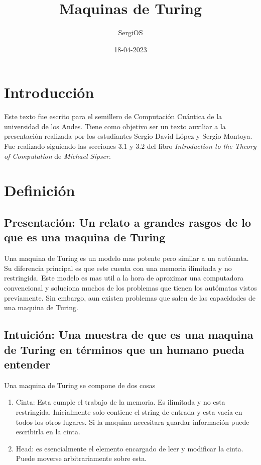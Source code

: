 \documentclass{report}
\title{\Huge{Maquinas de Turing}}
\author{\huge{SergiOS}}
\date{18-04-2023}
\begin{document}
\maketitle
\newpage%
\tableofcontents
\pagebreak

\chapter{Introducción}

Este texto fue escrito para el semillero de Computación Cuántica de la universidad de los Andes. Tiene como objetivo ser un texto auxiliar a la presentación realizada por los estudiantes Sergio David López y Sergio Montoya. Fue realizado siguiendo las secciones $3.1$ y $3.2$ del libro \textit{Introduction to the Theory of Computation} de \textit{Michael Sipser}.
\chapter{Definición}
\section{Presentación: Un relato a grandes rasgos de lo que es una maquina de Turing}
Una maquina de Turing es un modelo mas potente pero similar a un autómata. Su diferencia principal es que este cuenta con una memoria ilimitada y no restringida. Este modelo es mas util a la hora de aproximar una computadora convencional y soluciona muchos de los problemas que tienen los autómatas vistos previamente. Sin embargo, aun existen problemas que salen de las capacidades de una maquina de Turing.
\section{Intuición: Una muestra de que es una maquina de Turing en términos que un humano pueda entender}

Una maquina de Turing se compone de dos cosas
\begin{enumerate}
  \item Cinta: Esta cumple el trabajo de la memoria. Es ilimitada y no esta restringida. Inicialmente solo contiene el string de entrada y esta vacía en todos los otros lugares. Si la maquina necesitara guardar información puede escribirla en la cinta.
  \item Head: es esencialmente el elemento encargado de leer y modificar la cinta. Puede moverse arbitrariamente sobre esta.
\end{enumerate}
\end{document}
